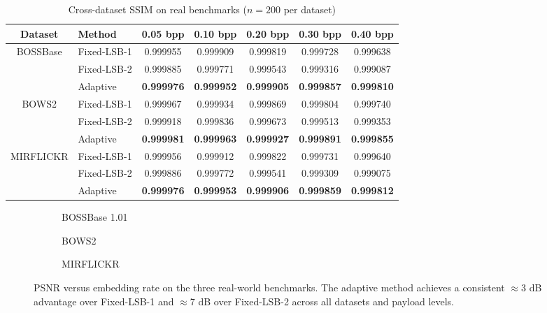 \begin{table}[H]
\centering
\caption{Cross-dataset SSIM on real benchmarks ($n = 200$ per dataset)}
\label{tab:ssim_cross}
\begin{adjustbox}{max width=\textwidth}
\begin{tabular}{clccccc}
\toprule
Dataset & Method & 0.05 bpp & 0.10 bpp & 0.20 bpp & 0.30 bpp & 0.40 bpp \\
\midrule
\multirow{3}{*}{BOSSBase} & Fixed-LSB-1 & 0.999955 & 0.999909 & 0.999819 & 0.999728 & 0.999638 \\
                           & Fixed-LSB-2 & 0.999885 & 0.999771 & 0.999543 & 0.999316 & 0.999087 \\
                           & Adaptive    & \textbf{0.999976} & \textbf{0.999952} & \textbf{0.999905} & \textbf{0.999857} & \textbf{0.999810} \\
\midrule
\multirow{3}{*}{BOWS2}    & Fixed-LSB-1 & 0.999967 & 0.999934 & 0.999869 & 0.999804 & 0.999740 \\
                           & Fixed-LSB-2 & 0.999918 & 0.999836 & 0.999673 & 0.999513 & 0.999353 \\
                           & Adaptive    & \textbf{0.999981} & \textbf{0.999963} & \textbf{0.999927} & \textbf{0.999891} & \textbf{0.999855} \\
\midrule
\multirow{3}{*}{MIRFLICKR} & Fixed-LSB-1 & 0.999956 & 0.999912 & 0.999822 & 0.999731 & 0.999640 \\
                           & Fixed-LSB-2 & 0.999886 & 0.999772 & 0.999541 & 0.999309 & 0.999075 \\
                           & Adaptive    & \textbf{0.999976} & \textbf{0.999953} & \textbf{0.999906} & \textbf{0.999859} & \textbf{0.999812} \\
\bottomrule
\end{tabular}
\end{adjustbox}
\end{table}

\begin{figure}[H]
    \centering
    \begin{subfigure}{0.32\linewidth}
        \caption{BOSSBase 1.01}
    \end{subfigure}
    \hfill
    \begin{subfigure}{0.32\linewidth}
        \caption{BOWS2}
    \end{subfigure}
    \hfill
    \begin{subfigure}{0.32\linewidth}
        \caption{MIRFLICKR}
    \end{subfigure}
    \caption{PSNR versus embedding rate on the three real-world benchmarks. The adaptive method achieves a consistent $\approx$3 dB advantage over Fixed-LSB-1 and $\approx$7 dB over Fixed-LSB-2 across all datasets and payload levels.}
    \label{fig:real_psnr}
\end{figure}

